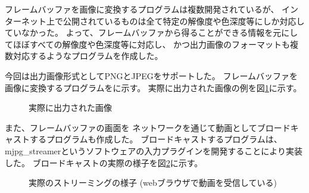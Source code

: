 \def \wrkdir {p.fb/}
\def \fb {\texttt{fb}}

\label{pa:fb}

フレームバッファを画像に変換するプログラムは複数開発されているが、
インターネット上で公開されているものは全て特定の解像度や色深度等にしか対応していなかった。
よって、フレームバッファから得ることができる情報を元にしてほぼすべての解像度や色深度等に対応し、
かつ出力画像のフォーマットも複数対応するようなプログラムを作成した。

今回は出力画像形式としてPNGとJPEGをサポートした。
フレームバッファを画像に変換するプログラムを\cite{bib:fb}に示す。
実際に出力された画像の例を図\ref{fig:fb2i-out}に示す。

\begin{figure}[htb]
\centering
\begin{minipage}{0.6\linewidth}
\caption{実際に出力された画像}
\label{fig:fb2i-out}
\end{minipage}
\end{figure}

また、フレームバッファの画面を
ネットワークを通じて動画としてブロードキャストするプログラムも作成した。
ブロードキャストするプログラムは、
mjpg\_streamerというソフトウェアの入力プラグインを開発することにより実装した。
ブロードキャストの実際の様子を図\ref{fig:fb2i-bcast}に示す。

\begin{figure}[htb]
\centering
\begin{minipage}{0.6\linewidth}
\caption{実際のストリーミングの様子 (webブラウザで動画を受信している)}
\label{fig:fb2i-bcast}
\end{minipage}
\end{figure}

